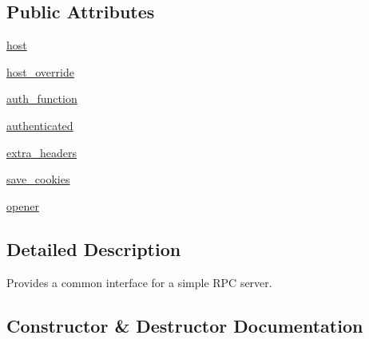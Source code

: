 \subsection*{Public Attributes}
\begin{DoxyCompactItemize}
\item 
\hyperlink{classupload_1_1_abstract_rpc_server_ab7188d827e2faddcf970f524f5856192}{host}
\item 
\hyperlink{classupload_1_1_abstract_rpc_server_a783a4a7e4ffb776a57a3f267300a213b}{host\+\_\+override}
\item 
\hyperlink{classupload_1_1_abstract_rpc_server_aee0090a3bcf07b913a7dd596a5dabb8f}{auth\+\_\+function}
\item 
\hyperlink{classupload_1_1_abstract_rpc_server_a692955750c802e461c6336d3000cd365}{authenticated}
\item 
\hyperlink{classupload_1_1_abstract_rpc_server_adbbf0109afc13d58d7815fa143cb779f}{extra\+\_\+headers}
\item 
\hyperlink{classupload_1_1_abstract_rpc_server_affe342205c4647d41b127f5a5634858b}{save\+\_\+cookies}
\item 
\hyperlink{classupload_1_1_abstract_rpc_server_aa931446476e0e86f3ade7fef0a0aea5a}{opener}
\end{DoxyCompactItemize}


\subsection{Detailed Description}
\begin{DoxyVerb}Provides a common interface for a simple RPC server.\end{DoxyVerb}
 

\subsection{Constructor \& Destructor Documentation}
